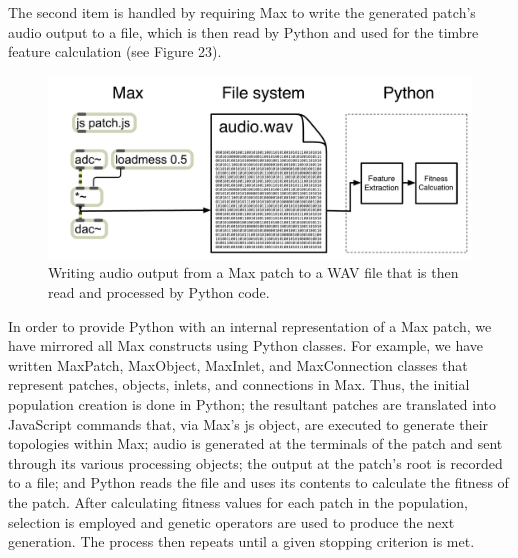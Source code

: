 \documentclass[12pt]{report} 	%
\numberwithin{figure}{chapter}
\numberwithin{table}{chapter}
\numberwithin{equation}{chapter}
\begin{document}
\begin{flushleft}
The second item is handled by requiring Max to write the generated patch's audio output to a file, which is then read by Python and used for the timbre feature calculation (see Figure 23).
\begin{figure}[h!]
\begin{center}
\includegraphics[scale=0.4]{MaxAudioToPython}
\caption[From Max to Python]{Writing audio output from a Max patch to a WAV file that is then read and processed by Python code.}
\end{center}
\end{figure}

In order to provide Python with an internal representation of a Max patch, we have mirrored all Max constructs using Python classes. For example, we have written MaxPatch, MaxObject, MaxInlet, and MaxConnection classes that represent patches, objects, inlets, and connections in Max. Thus, the initial population creation is done in Python; the resultant patches are translated into JavaScript commands that, via Max's js object, are executed to generate their topologies within Max; audio is generated at the terminals of the patch and sent through its various processing objects; the output at the patch's root is recorded to a file; and Python reads the file and uses its contents to calculate the fitness of the patch. After calculating fitness values for each patch in the population, selection is employed and genetic operators are used to produce the next generation. The process then repeats until a given stopping criterion is met.


\end{flushleft}
\end{document}
